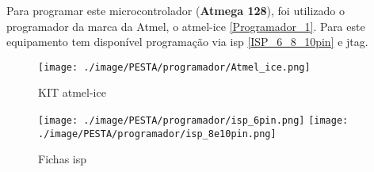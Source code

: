 Para programar este microcontrolador (\textbf{Atmega 128}), foi utilizado o programador da marca da Atmel, o \ac{atmel-ice} \autoref{Programador_1}. Para este equipamento tem disponível programação via \ac{isp} \autoref{ISP_6_8_10pin} e \ac{jtag}.
\begin{minipage}[!b]{.5\linewidth}
	\begin{figure}[H]
		\captionsetup{justification=raggedright,singlelinecheck=false}
		\flushleft
		\texttt{[image: ./image/PESTA/programador/Atmel\_ice.png]}
		\caption{KIT \acs{atmel-ice}}
		\label{Programador_1}
	\end{figure}
\end{minipage}
\hspace{.5cm}
\begin{minipage}[!b]{.5\linewidth}
	\begin{figure}[H]
		\captionsetup{justification=raggedright,singlelinecheck=false}
		\flushleft
		\texttt{[image: ./image/PESTA/programador/isp\_6pin.png]}
		\texttt{[image: ./image/PESTA/programador/isp\_8e10pin.png]}
		\caption{Fichas \acs{isp}}
		\label{ISP_6_8_10pin}
	\end{figure}
\end{minipage}
